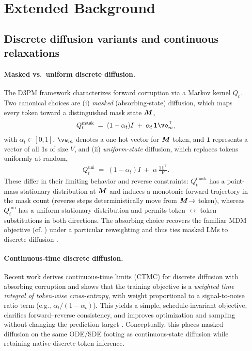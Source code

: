 \section{Extended Background}
\label{sec:appendix_extended_background}
\subsection{Discrete diffusion variants and continuous relaxations}
\label{sec:appendix_variants}
\paragraph{Masked vs.\ uniform discrete diffusion.}
The D3PM framework \citep{austin2021structured} characterizes forward corruption via a Markov kernel $Q_t$. Two canonical choices are (i) \emph{masked} (absorbing-state) diffusion, which maps every token toward a distinguished mask state ${\bm{M}}$,
\begin{align*}
Q_t^{\text{mask}} \;=\; (1-\alpha_t)I \;+\; \alpha_t\,\mathbf{1}\ve_m^\top,
\end{align*}
with $\alpha_t \in [0, 1]$, $\ve_m$ denotes a one-hot vector for ${\bm{M}}$ token, and $\mathbf{1}$ represents a vector of all 1s of size $V$, and (ii) \emph{uniform-state} diffusion, which replaces tokens uniformly at random,
\begin{align*}
Q_t^{\text{uni}} \;=\; (1-\alpha_t)I \;+\; \alpha\,\tfrac{\mathbf{1}\mathbf{1}^\top}{V}.    
\end{align*}
These differ in their limiting behavior and reverse constraints: $Q_t^{\text{mask}}$ has a point-mass stationary distribution at ${\bm{M}}$ and induces a monotonic forward trajectory in the mask count (reverse steps deterministically move from ${\bm{M}}\!\to$ token), whereas $Q_t^{\text{uni}}$ has a uniform stationary distribution and permits token $\!\leftrightarrow$ token substitutions in both directions. The absorbing choice recovers the familiar MDM objective (cf. ) under a particular reweighting \citep{ou2024your} and thus ties masked LMs to discrete diffusion \citep{austin2021structured}.
\paragraph{Continuous-time discrete diffusion.}
Recent work derives continuous-time limits (CTMC) for discrete diffusion with absorbing corruption and shows that the training objective is a \emph{weighted time integral of token-wise cross-entropy}, with weight proportional to a signal-to-noise ratio term (e.g., $\alpha_t/(1-\alpha_t)$). This yields a simple, schedule-invariant objective, clarifies forward–reverse consistency, and improves optimization and sampling without changing the prediction target \citep{DBLP:conf/nips/ShiHWDT24,sahoo2024simple}. Conceptually, this places masked diffusion on the same ODE/SDE footing as continuous-state diffusion \citep{DBLP:conf/nips/KingmaG23} while retaining native discrete token inference.
